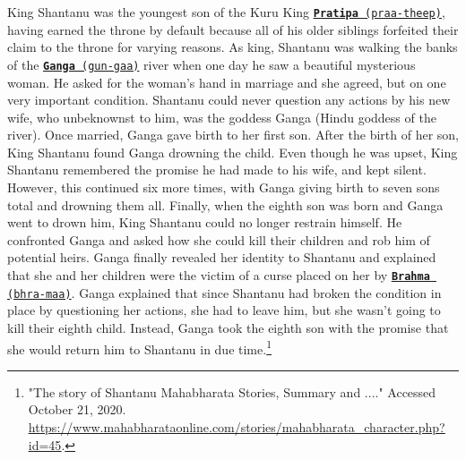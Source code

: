 \documentclass[10pt, letterpaper]{article}
\begin{document}
King Shantanu was the youngest son of the Kuru King
\texttt{\underline{\href{https://drive.google.com/file/d/1cFMOXmljJqY1Ozkw8zhMyl3Y7uTlzg_3/view?usp=sharing}{\textbf{Pratipa}}
(praa-theep)}}, having earned the throne by default because all of his
older siblings forfeited their claim to the throne for varying reasons.
As king, Shantanu was walking the banks of the
\texttt{\underline{\href{https://drive.google.com/file/d/1lhsOVMsRz9JIYvKQYeOk1_5M4USAuRgc/view?usp=sharing}{\textbf{Ganga}}
(gun-gaa)}} river when one day he saw a beautiful mysterious woman. He
asked for the woman's hand in marriage and she agreed, but on one very
important condition. Shantanu could never question any actions by his
new wife, who unbeknownst to him, was the goddess Ganga (Hindu goddess
of the river). Once married, Ganga gave birth to her first son. After
the birth of her son, King Shantanu found Ganga drowning the child. Even
though he was upset, King Shantanu remembered the promise he had made to
his wife, and kept silent. However, this continued six more times, with
Ganga giving birth to seven sons total and drowning them all. Finally,
when the eighth son was born and Ganga went to drown him, King Shantanu
could no longer restrain himself. He confronted Ganga and asked how she
could kill their children and rob him of potential heirs. Ganga finally
revealed her identity to Shantanu and explained that she and her
children were the victim of a curse placed on her by
\texttt{\underline{\href{https://drive.google.com/file/d/1ZLRx23lThXknyJ40FbeLpn5CkJkJuviF/view?usp=sharing}{\textbf{Brahma}}
(bhra-maa)}}. Ganga explained that since Shantanu had broken the
condition in place by questioning her actions, she had to leave him, but
she wasn't going to kill their eighth child. Instead, Ganga took the
eighth son with the promise that she would return him to Shantanu in due
time.\footnote{"The story of Shantanu \textbar{} Mahabharata Stories,
  Summary and ...." Accessed October 21, 2020.
  \href{https://www.mahabharataonline.com/stories/mahabharata_character.php?id=45}{\underline{https://www.mahabharataonline.com/stories/mahabharata\_character.php?id=45}}.} \\
\end{document}

